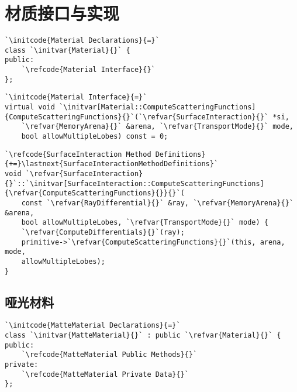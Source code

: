 \section{材质接口与实现}\label{sec:材质接口与实现}

\begin{lstlisting}
`\initcode{Material Declarations}{=}`
class `\initvar{Material}{}` {
public:
    `\refcode{Material Interface}{}`
};
\end{lstlisting}

\begin{lstlisting}
`\initcode{Material Interface}{=}`
virtual void `\initvar[Material::ComputeScatteringFunctions]{ComputeScatteringFunctions}{}`(`\refvar{SurfaceInteraction}{}` *si,
    `\refvar{MemoryArena}{}` &arena, `\refvar{TransportMode}{}` mode,
    bool allowMultipleLobes) const = 0;
\end{lstlisting}

\begin{lstlisting}
`\refcode{SurfaceInteraction Method Definitions}{+=}\lastnext{SurfaceInteractionMethodDefinitions}`
void `\refvar{SurfaceInteraction}{}`::`\initvar[SurfaceInteraction::ComputeScatteringFunctions]{\refvar{ComputeScatteringFunctions}{}}{}`(
    const `\refvar{RayDifferential}{}` &ray, `\refvar{MemoryArena}{}` &arena,
    bool allowMultipleLobes, `\refvar{TransportMode}{}` mode) {
    `\refvar{ComputeDifferentials}{}`(ray);
    primitive->`\refvar{ComputeScatteringFunctions}{}`(this, arena, mode,
    allowMultipleLobes);
}
\end{lstlisting}

\subsection{哑光材料}\label{sub:哑光材料}
\begin{lstlisting}
`\initcode{MatteMaterial Declarations}{=}`
class `\initvar{MatteMaterial}{}` : public `\refvar{Material}{}` {
public:
    `\refcode{MatteMaterial Public Methods}{}`
private:
    `\refcode{MatteMaterial Private Data}{}`
};
\end{lstlisting}